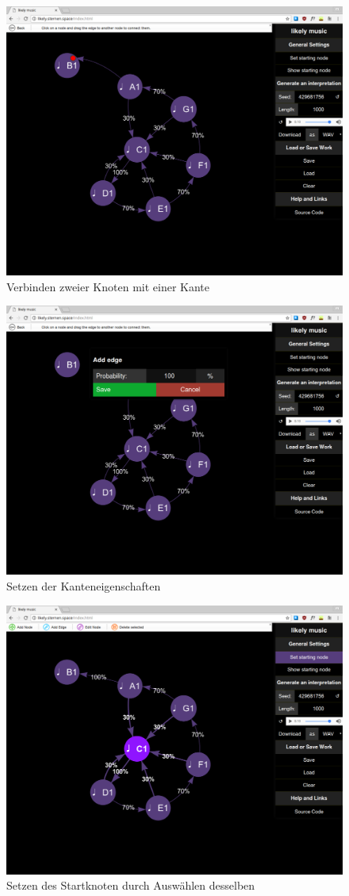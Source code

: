 \documentclass[a4paper,twocolumn]{article}
\begin{document}
\begin{figure}[H]
  \begin{center}
  \includegraphics[width=.7\textwidth]{screenshots/add-edge-drag.png}
  \end{center}
  \caption{Verbinden zweier Knoten mit einer Kante}
\end{figure}

\begin{figure}[H]
  \begin{center}
  \includegraphics[width=.7\textwidth]{screenshots/add-edge.png}
  \end{center}
  \caption{Setzen der Kanteneigenschaften}
\end{figure}

\begin{figure}[H]
  \begin{center}
  \includegraphics[width=.8\textwidth]{screenshots/starting-node.png}
  \end{center}
  \caption{Setzen des Startknoten durch Auswählen desselben}
\end{figure}
\end{document}
